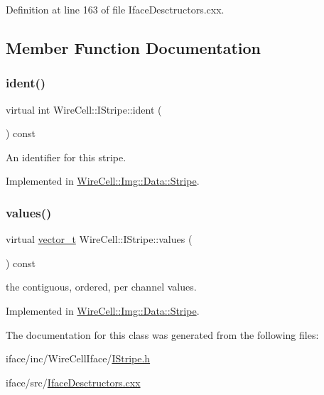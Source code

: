Definition at line 163 of file Iface\+Desctructors.\+cxx.



\subsection{Member Function Documentation}
\mbox{\label{class_wire_cell_1_1_i_stripe_a9873be5b4e6796ac5f08ea1511b0ae1f}} 
\subsubsection{\texorpdfstring{ident()}{ident()}}
{\footnotesize\ttfamily virtual int Wire\+Cell\+::\+I\+Stripe\+::ident (\begin{DoxyParamCaption}{ }\end{DoxyParamCaption}) const\hspace{0.3cm}{\ttfamily [pure virtual]}}



An identifier for this stripe. 



Implemented in \hyperlink{class_wire_cell_1_1_img_1_1_data_1_1_stripe_a9795b25ab93a45b59670f8105dbb78ae}{Wire\+Cell\+::\+Img\+::\+Data\+::\+Stripe}.

\mbox{\label{class_wire_cell_1_1_i_stripe_aff1919f580099c2465c7d83dc9d7de18}} 
\subsubsection{\texorpdfstring{values()}{values()}}
{\footnotesize\ttfamily virtual \hyperlink{class_wire_cell_1_1_i_stripe_af5a7b9f663e9ecbc71edfb44c989101e}{vector\+\_\+t} Wire\+Cell\+::\+I\+Stripe\+::values (\begin{DoxyParamCaption}{ }\end{DoxyParamCaption}) const\hspace{0.3cm}{\ttfamily [pure virtual]}}



the contiguous, ordered, per channel values. 



Implemented in \hyperlink{class_wire_cell_1_1_img_1_1_data_1_1_stripe_a72dce0e16019dff990761fc29fca0e30}{Wire\+Cell\+::\+Img\+::\+Data\+::\+Stripe}.



The documentation for this class was generated from the following files\+:\begin{DoxyCompactItemize}
\item 
iface/inc/\+Wire\+Cell\+Iface/\hyperlink{_i_stripe_8h}{I\+Stripe.\+h}\item 
iface/src/\hyperlink{_iface_desctructors_8cxx}{Iface\+Desctructors.\+cxx}\end{DoxyCompactItemize}
